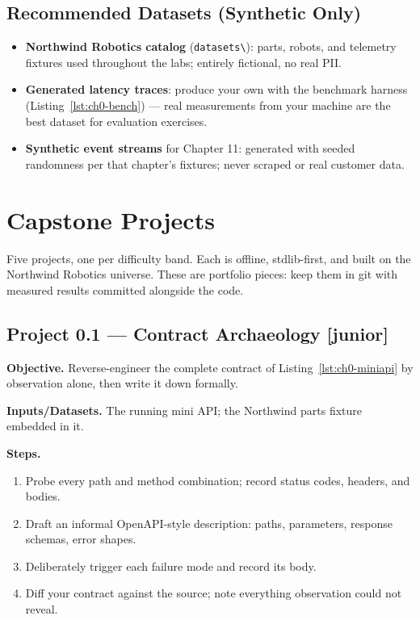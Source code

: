 \subsection{Recommended Datasets (Synthetic Only)}
\begin{itemize}
  \item \textbf{Northwind Robotics catalog} (\texttt{datasets\textbackslash}):
    parts, robots, and telemetry fixtures used throughout the labs;
    entirely fictional, no real PII.
  \item \textbf{Generated latency traces}: produce your own with the
    benchmark harness (Listing~\ref{lst:ch0-bench}) --- real measurements
    from your machine are the best dataset for evaluation exercises.
  \item \textbf{Synthetic event streams} for Chapter 11: generated with
    seeded randomness per that chapter's fixtures; never scraped or real
    customer data.
\end{itemize}

\section{Capstone Projects}
\label{sec:ch0-capstones}

Five projects, one per difficulty band. Each is offline, stdlib-first, and
built on the Northwind Robotics universe. These are portfolio pieces: keep
them in git with measured results committed alongside the code.

\subsection{Project 0.1 --- Contract Archaeology \textnormal{[junior]}}

\textbf{Objective.} Reverse-engineer the complete contract of
Listing~\ref{lst:ch0-miniapi} by observation alone, then write it down
formally.

\textbf{Inputs/Datasets.} The running mini API; the Northwind parts fixture
embedded in it.

\textbf{Steps.}
\begin{enumerate}
  \item Probe every path and method combination; record status codes,
        headers, and bodies.
  \item Draft an informal OpenAPI-style description: paths, parameters,
        response schemas, error shapes.
  \item Deliberately trigger each failure mode and record its body.
  \item Diff your contract against the source; note everything observation
        could not reveal.
\end{enumerate}

